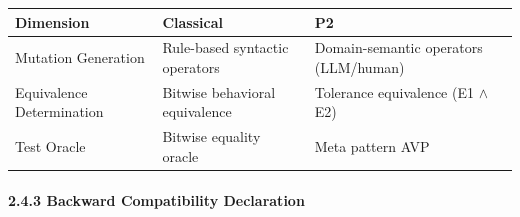 \documentclass[review,12pt,authoryear]{elsarticle}
\begin{document}
{\def\LTcaptype{none} %
\begin{longtable}[]{@{}
  >{\raggedright\arraybackslash}p{}
  >{\raggedright\arraybackslash}p{}
  >{\raggedright\arraybackslash}p{}@{}}
\toprule\noalign{}
\begin{minipage}[b]{\linewidth}\raggedright
Dimension
\end{minipage} & \begin{minipage}[b]{\linewidth}\raggedright
Classical
\end{minipage} & \begin{minipage}[b]{\linewidth}\raggedright
P2
\end{minipage} \\
\midrule\noalign{}
\endhead
\bottomrule\noalign{}
\endlastfoot
Mutation Generation & Rule-based syntactic operators & Domain-semantic
operators (LLM/human) \\
Equivalence Determination & Bitwise behavioral equivalence & Tolerance
equivalence (E1 $\wedge$ E2) \\
Test Oracle & Bitwise equality oracle & Meta pattern AVP \\
\end{longtable}
}

\paragraph{2.4.3 Backward Compatibility
Declaration}\label{backward-compatibility-declaration}
\end{document}
